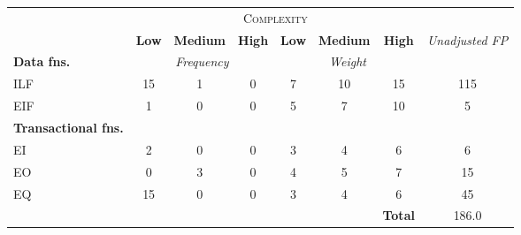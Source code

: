 
\begin{tabular}{|l|c|c|c|c|c|c|c|}
\cline{2-7}
\multicolumn{1}{c}{} & \multicolumn{6}{|c|}{\textsc{Complexity}} & \multicolumn{1}{c}{}  \\ \cline{2-8}
\multicolumn{1}{c|}{} & \textbf{Low} & \textbf{Medium} & \textbf{High} & \textbf{Low} & \textbf{Medium} & \textbf{High} & \multirow{2}{*}{\textit{Unadjusted FP}} \\ \cline{1-7}
\textbf{Data fns.} & \multicolumn{3}{|c|}{\textit{Frequency}} &  \multicolumn{3}{|c|}{\textit{Weight}} & \\ \hline
ILF 	& 15 & 1 & 0 & 7 & 10 & 15 & 115 	\\ \hline
EIF 	& 1  & 0 & 0 & 5 & 7 & 10 & 5		\\ \hline
\textbf{Transactional fns.} & \multicolumn{7}{|c|}{} \\ \hline
EI 		& 2  & 0 & 0 & 3 & 4 & 6 & 6 		\\ \hline
EO 		& 0  & 3 & 0 & 4 & 5 & 7 & 15		\\ \hline
EQ		& 15 & 0 & 0 & 3 & 4 & 6 & 45		\\ \hline
\multicolumn{6}{c|}{} & \textbf{Total} & 186.0 \\ \cline{7-8}
\end{tabular}
